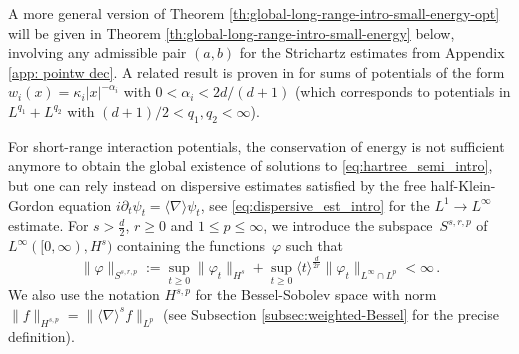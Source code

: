 \documentclass[12pt]{article}
\theoremstyle{plain}
\begin{document}
A more general version of Theorem \ref{th:global-long-range-intro-small-energy-opt} will be given in Theorem \ref{th:global-long-range-intro-small-energy} below, involving any admissible pair $(a,b)$ for the Strichartz estimates from Appendix \ref{app: pointw dec}. A related result is proven in \cite{ChoOzawa2} for sums of potentials of the form $w_i(x)=\kappa_i|x|^{-\alpha_i}$ with $0<\alpha_i<2d/(d+1)$ (which corresponds to potentials in $L^{q_1}+L^{q_2}$ with $(d+1)/2< q_1,q_2<\infty$).


For short-range interaction potentials, the conservation of energy is not sufficient anymore to obtain the global existence of solutions to \eqref{eq:hartree_semi_intro}, but one can rely instead on dispersive estimates satisfied by the free half-Klein-Gordon equation $i\partial_t\psi_t=\langle\nabla\rangle\psi_t$, see \eqref{eq:dispersive_est_intro} for the $L^1\to L^\infty$ estimate. For $s>\frac{d}2$, $r\ge0$ and $1\le p\le\infty$, we introduce the subspace~$S^{s,r,p}$ of~$L^{\infty}([0,\infty),H^{s})$ containing the functions~$\varphi$ such that
\begin{equation}\label{eq:def-Ssrp}
\|\varphi\|_{S^{s,r,p}}:=\sup_{t\ge0}\|\varphi_{t}\|_{H^{s}}+\sup_{t\ge0}\langle t\rangle^{\frac{d}{2r}}\|\varphi_{t}\|_{L^{\infty}\cap L^{p}}<\infty\,.
\end{equation}
We also use the notation $H^{s,p}$ for the Bessel-Sobolev space with norm $\|f\|_{H^{s,p}} = \|\langle \nabla \rangle^s f\|_{L^p}$ (see Subsection \ref{subsec:weighted-Bessel} for the precise definition).
\end{document}

